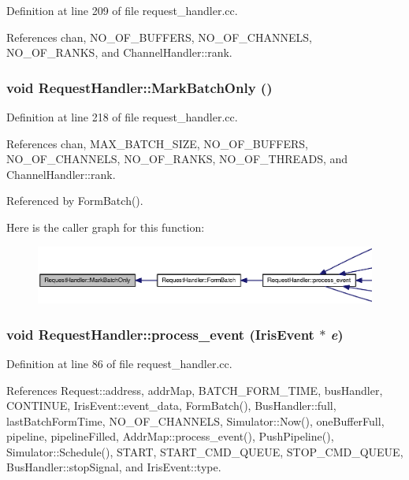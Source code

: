 Definition at line 209 of file request\_\-handler.cc.

References chan, NO\_\-OF\_\-BUFFERS, NO\_\-OF\_\-CHANNELS, NO\_\-OF\_\-RANKS, and ChannelHandler::rank.
\subsubsection[{MarkBatchOnly}]{\setlength{\rightskip}{0pt plus 5cm}void RequestHandler::MarkBatchOnly ()}\label{classRequestHandler_7333638ede01b551db94364367a40599}




Definition at line 218 of file request\_\-handler.cc.

References chan, MAX\_\-BATCH\_\-SIZE, NO\_\-OF\_\-BUFFERS, NO\_\-OF\_\-CHANNELS, NO\_\-OF\_\-RANKS, NO\_\-OF\_\-THREADS, and ChannelHandler::rank.

Referenced by FormBatch().

Here is the caller graph for this function:\nopagebreak
\begin{figure}[H]
\begin{center}
\leavevmode
\includegraphics[width=420pt]{classRequestHandler_7333638ede01b551db94364367a40599_icgraph}
\end{center}
\end{figure}
\subsubsection[{process\_\-event}]{\setlength{\rightskip}{0pt plus 5cm}void RequestHandler::process\_\-event ({\bf IrisEvent} $\ast$ {\em e})}\label{classRequestHandler_c295b7e01ed866b390c93a559f375b2f}




Definition at line 86 of file request\_\-handler.cc.

References Request::address, addrMap, BATCH\_\-FORM\_\-TIME, busHandler, CONTINUE, IrisEvent::event\_\-data, FormBatch(), BusHandler::full, lastBatchFormTime, NO\_\-OF\_\-CHANNELS, Simulator::Now(), oneBufferFull, pipeline, pipelineFilled, AddrMap::process\_\-event(), PushPipeline(), Simulator::Schedule(), START, START\_\-CMD\_\-QUEUE, STOP\_\-CMD\_\-QUEUE, BusHandler::stopSignal, and IrisEvent::type.

